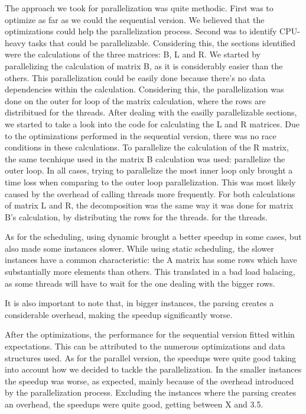 \documentclass[a4paper]{article}
\begin{document}
The approach we took for parallelization was quite methodic. First was to
optimize as far as we could the sequential version. We believed that the
optimizations could help the parallelization process. Second was to identify
CPU-heavy tasks that could be  parallelizable. Considering this, the sections
identified were the calculations of the three matrices: B, L and R.  We started
by parallelizing the calculation of matrix B, as it is considerably easier than
the others. This parallelization could be easily done because there's no data
dependencies within the calculation. Considering this, the parallelization was
done on the outer for loop of the matrix calculation, where the rows are
distribitued for the threads. After dealing with the easilly parallelizable
sections, we started to take a look into the code for calculating the L and R
matrices. Due to the optimizations performed in the sequential version, there
was no race conditions in these calculations. %
To parallelize the calculation of the R matrix, the same tecnhique used in the
matrix B calculation was used: parallelize the outer loop. In all cases, trying
to parallelize the most inner loop only brought a time loss when comparing to
the outer loop parallelization.  This was most likely caused by the overhead of
calling threads more frequently.
For both calculations of matrix L and R, the decomposition was the same way it
was done for matrix B's calculation, by distributing the rows for the threads.
for the threads.


As for the scheduling, using dynamic brought a better speedup in some cases, but
also made some instances slower. While using static scheduling, the slower
instances have a common characteristic: the A matrix has some rows which have
substantially more elements than others.  This translated in a bad load
balacing, as some threads will have to wait for the one dealing with the bigger
rows.



It is also important to note that, in bigger instances, the parsing creates a
considerable overhead, making the speedup significantly worse.

After the optimizations, the performance for the sequential version fitted
within expectations. This can be attributed to the numerous optimizations and
data structures used.  As for the parallel version, the speedups were quite good
taking into account how we decided to tackle the parallelization. In the smaller
instances the speedup was worse, as expected, mainly because of the overhead
introduced by the parallelization process. Excluding the instances where the
parsing creates an overhead, the speedups were quite good, getting between X
and 3.5.


\end{document}
